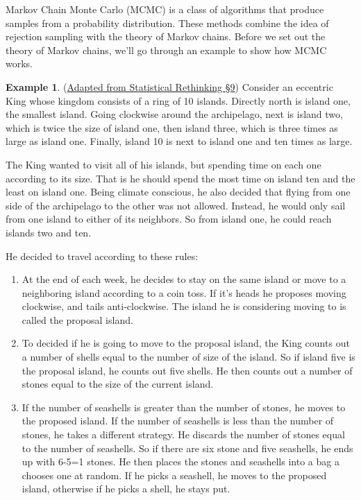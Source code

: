\documentclass[
]{book}
\theoremstyle{definition}
\theoremstyle{definition}
\newtheorem{example}{Example}[chapter]
\theoremstyle{definition}
\theoremstyle{definition}
\theoremstyle{remark}
\begin{document}
Markov Chain Monte Carlo (MCMC) is a class of algorithms that produce samples from a probability distribution. These methods combine the idea of rejection sampling with the theory of Markov chains. Before we set out the theory of Markov chains, we'll go through an example to show how MCMC works.

\begin{example}
\protect\hypertarget{exm:King}{}\label{exm:King}(\href{https://xcelab.net/rm/statistical-rethinking/}{Adapted from Statistical Rethinking \S 9}) Consider an eccentric King whose kingdom consists of a ring of 10 islands. Directly north is island one, the smallest island. Going clockwise around the archipelago, next is island two, which is twice the size of island one, then island three, which is three times as large as island one. Finally, island 10 is next to island one and ten times as large.

The King wanted to visit all of his islands, but spending time on each one according to its size. That is he should spend the most time on island ten and the least on island one. Being climate conscious, he also decided that flying from one side of the archipelago to the other was not allowed. Instead, he would only sail from one island to either of its neighbors. So from island one, he could reach islands two and ten.

He decided to travel according to these rules:

\begin{enumerate}
\def\labelenumi{\arabic{enumi}.}
\item
  At the end of each week, he decides to stay on the same island or move to a neighboring island according to a coin toss. If it's heads he proposes moving clockwise, and tails anti-clockwise. The island he is considering moving to is called the proposal island.
\item
  To decided if he is going to move to the proposal island, the King counts out a number of shells equal to the number of size of the island. So if island five is the proposal island, he counts out five shells. He then counts out a number of stones equal to the size of the current island.
\item
  If the number of seashells is greater than the number of stones, he moves to the proposed island. If the number of seashells is less than the number of stones, he takes a different strategy. He discards the number of stones equal to the number of seashells. So if there are six stone and five seashells, he ends up with 6-5=1 stones. He then places the stones and seashells into a bag a chooses one at random. If he picks a seashell, he moves to the proposed island, otherwise if he picks a shell, he stays put.
\end{enumerate}


\end{example}
\end{document}
